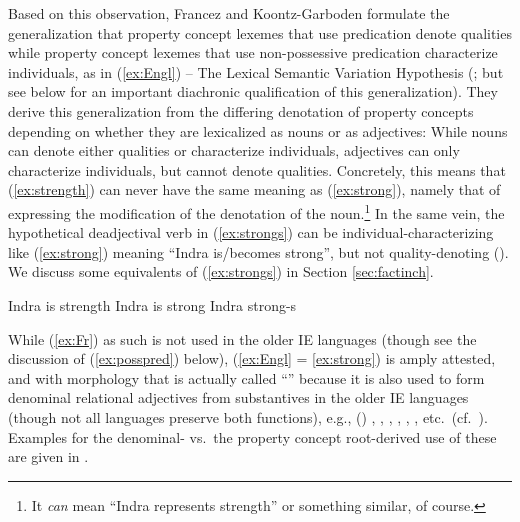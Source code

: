 \documentclass[output=paper,colorlinks,citecolor=brown]{langscibook}
\begin{document}
Based on this observation, Francez and Koontz-Garboden formulate the generalization that property concept lexemes that use  predication denote qualities while property concept lexemes that use non-possessive predication characterize individuals, as in (\ref{ex:Engl}) -- The Lexical Semantic Variation Hypothesis (\citealt[77]{FrancezKoontz2017}; but see below for an important diachronic qualification of this generalization). They derive this generalization from the differing denotation of property concepts depending on whether they are lexicalized as nouns or as adjectives: While nouns can denote either qualities or characterize individuals, adjectives can only characterize individuals, but cannot denote qualities. Concretely, this means that (\ref{ex:strength}) can never have the same meaning as (\ref{ex:strong}), namely that of expressing the modification of the denotation of the noun.\footnote{It \emph{can} mean ``Indra represents strength'' or something similar, of course.} In the same vein, the hypothetical deadjectival verb in (\ref{ex:strongs}) can be individual-characterizing like (\ref{ex:strong}) meaning ``Indra is/becomes strong'', but not quality-denoting (\citealt[83--84]{FrancezKoontz2017}). We discuss some  equivalents of (\ref{ex:strongs}) in Section \ref{sec:factinch}. 


\begin{exe}
    \ex \begin{xlist}
        \ex Indra is strength \label{ex:strength}
        \ex Indra is strong \label{ex:strong}
        \ex Indra strong-s \label{ex:strongs}
    \end{xlist}
\end{exe}




While (\ref{ex:Fr}) as such is not used in the older IE languages (though see the discussion of (\ref{ex:posspred}) below), (\ref{ex:Engl} = \ref{ex:strong})   is amply attested, and  with morphology that is actually called ``'' because it is also used to form denominal relational  adjectives  from substantives in the older IE languages (though not all languages preserve both functions), e.g., () , , , , \mbox{,} , etc.\ (cf.\ \citealt[77--78]{Rau2009}). Examples for the denominal-  vs.\ the property concept root-derived use of these are given in .
\end{document}
